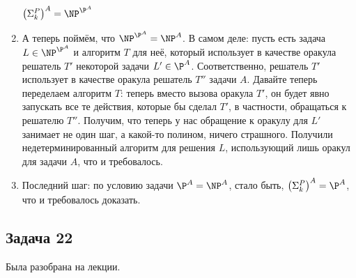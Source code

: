 \begin{enumerate}
			$\left(\Sigma_k^P\right)^A = \NP^{\P^A}$
		\item
			А теперь поймём, что $\NP^{\P^A}=\NP^A$.
			В самом деле: пусть есть задача $L\in \NP^{\P^A}$ и алгоритм $T$ для неё, который использует в качестве оракула решатель $T'$ некоторой задачи $L'\in \P^A$.
			Соответственно, решатель $T'$ использует в качестве оракула решатель $T''$ задачи $A$.
			Давайте теперь переделаем алгоритм $T$: теперь вместо вызова оракула $T'$, он будет явно запускать все те действия, которые бы сделал $T'$,
			в частности, обращаться к решателю $T''$.
			Получим, что теперь у нас обращение к оракулу для $L'$ занимает не один шаг, а какой-то полином, ничего страшного.
			Получили недетерминированный алгоритм для решения $L$, использующий лишь оракул для задачи $A$, что и требовалось.
		\item
			Последний шаг: по условию задачи $\P^A=\NP^A$, стало быть, $\left(\Sigma_k^P\right)^A = \P^A$, что и требовалось доказать.
	\end{enumerate}

\subsection{Задача 22}
	Была разобрана на лекции.
	\TODO
